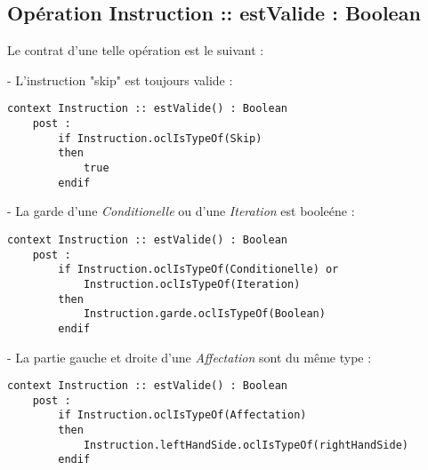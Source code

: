 
\subsection{Opération Instruction :: estValide : Boolean}
\label{sec:question19}

Le contrat d'une telle opération est le suivant :

- L'instruction "skip" est toujours valide :

\begin{lstlisting}[caption=Contrat \textsc{Ocl} sur l'opération estValide,captionpos=b,label={lst:valide},language=OCL]
context Instruction :: estValide() : Boolean
    post :
        if Instruction.oclIsTypeOf(Skip)
        then
            true
        endif
\end{lstlisting}

- La garde d'une \emph{Conditionelle} ou d'une \emph{Iteration} est booleéne :

\begin{lstlisting}[caption=Contrat \textsc{Ocl} sur la garde,captionpos=b,label={lst:garde},language=OCL]
context Instruction :: estValide() : Boolean
    post :
        if Instruction.oclIsTypeOf(Conditionelle) or
            Instruction.oclIsTypeOf(Iteration)
        then
            Instruction.garde.oclIsTypeOf(Boolean)
        endif
\end{lstlisting}

- La partie gauche et droite d'une \emph{Affectation} sont du même type :

\begin{lstlisting}[caption=Contrat \textsc{Ocl} les parties d'une affectation,captionpos=b,label={lst:parties},language=OCL]
context Instruction :: estValide() : Boolean
    post :
        if Instruction.oclIsTypeOf(Affectation)
        then
            Instruction.leftHandSide.oclIsTypeOf(rightHandSide)
        endif
\end{lstlisting}